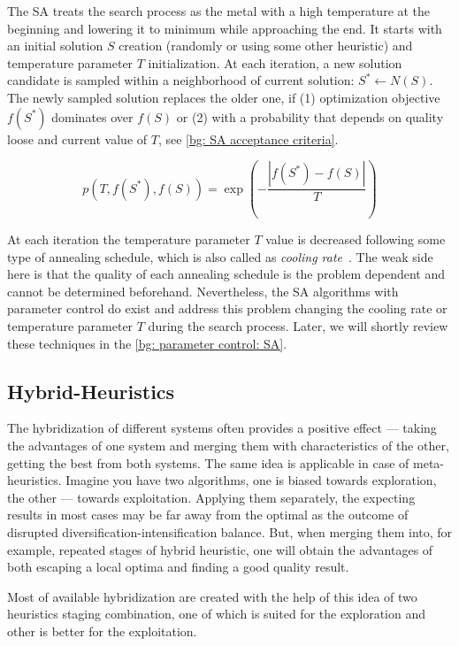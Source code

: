 The SA treats the search process as the metal with a high temperature at the beginning and lowering it to minimum while approaching the end. %
It starts with an initial solution $S$ creation (randomly or using some other heuristic) and temperature parameter $T$ initialization. At each iteration, a new solution candidate is sampled within a neighborhood of current solution: $S^* \leftarrow N(S)$. The newly sampled solution replaces the older one, if (1) optimization objective $f(S^*)$ dominates over $f(S)$ or (2) with a probability that depends on quality loose and current value of $T$, see \cref{bg: SA acceptance criteria}.

\begin{equation}
p(T, f(S^*), f(S)) = \exp(-\frac{|f(S^*) - f(S)|}{T})
\label{bg: SA acceptance criteria}
\end{equation}

At each iteration the temperature parameter $T$ value is decreased following some type of annealing schedule, which is also called as \textit{cooling rate}~\cite{boussaid2013survey}. The weak side here is that the quality of each annealing schedule is the problem dependent and cannot be determined beforehand. Nevertheless, the SA algorithms with parameter control do exist and address this problem changing the cooling rate or temperature parameter $T$ during the search process. Later, we will shortly review these techniques in the \cref{bg: parameter control: SA}.


\subsection{Hybrid-Heuristics}
The hybridization of different systems often provides a positive effect — taking the advantages of one system and merging them with characteristics of the other, getting the best from both systems. The same idea is applicable in case of meta-heuristics. Imagine you have two algorithms, one is biased towards exploration, the other — towards exploitation. Applying them separately, the expecting results in most cases may be far away from the optimal as the outcome of disrupted diversification-intensification balance. But, when merging them into, for example, repeated stages of hybrid heuristic, one will obtain the advantages of both escaping a local optima and finding a good quality result. 

Most of available hybridization are created with the help of this idea of two heuristics staging combination, one of which is suited for the exploration and other is better for the exploitation.

